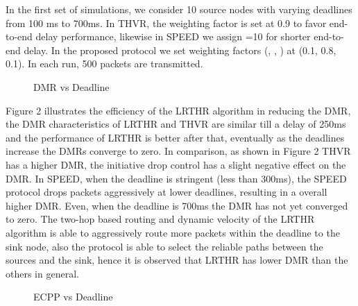 \documentclass[fleqn,twoside]{article}
\begin{document}
In the first set of simulations, we consider 10 source nodes with varying deadlines from 100 ms to 700ms. In THVR, the weighting factor  is set at 0.9 to favor end-to-end delay performance, likewise in SPEED we assign =10 for shorter end-to-end delay. In the proposed protocol we set weighting factors (, , ) at (0.1, 0.8, 0.1). In each run, 500 packets are transmitted. 

\begin{figure}
\begin{center}
\begin{small}
\caption{DMR vs Deadline}
\end{small}
\end{center}
\end{figure}
\vskip 2mm
Figure 2 illustrates the efficiency of the LRTHR algorithm in reducing the DMR, the DMR characteristics of LRTHR and THVR are similar till a delay of 250ms and the performance of LRTHR is better after that, eventually as the deadlines increase the DMRs converge to zero. 
In comparison, as shown in Figure 2 THVR has a higher DMR, the initiative drop control has a slight negative effect on the DMR. 
\vskip 2mm
In SPEED, when the deadline is stringent (less than 300ms), the SPEED protocol drops packets aggressively at lower deadlines, resulting in a overall higher DMR. Even, when the deadline is 700ms the DMR has not yet converged to zero. The two-hop based routing and dynamic velocity of the LRTHR algorithm is able to aggressively route more packets within the deadline to the sink node, also the protocol is able to select the reliable paths between the sources and the sink, hence it is observed that 
LRTHR has lower DMR than the others in general.

\begin{figure}
\begin{center}
\begin{small}
\caption{ECPP vs Deadline}
\end{small}
\end{center}
\end{figure}
\vskip 2mm
\end{document}
